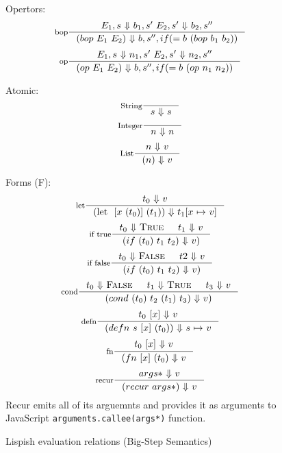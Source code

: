 \begin{figure}[ht]
\centering
Opertors:
\[
\inference[bop]{E_1, s \ $$\Downarrow$$ \ b_1, s' \ E_2, s' \ $$\Downarrow$$ \ b_2, s''}
{(bop \ E_1 \ E_2) \ $$\Downarrow$$ \ b, s'', if (= b \ (bop \ b_1 \ b_2))}
\]
\[
\inference[op]{E_1, s \ $$\Downarrow$$ \ n_1, s' \ E_2, s' \ $$\Downarrow$$ \ n_2, s''}
{(op \ E_1 \ E_2) \ $$\Downarrow$$ \ b, s'', if (= b \ (op \ n_1 \ n_2))}
\]


Atomic:
\[
\inference[String]{}
{s \ $$\Downarrow$$ \ s}
\]
\[
\inference[Integer]{}
{n \ $$\Downarrow$$ \ n}
\]
\[
\inference[List]{n \ $$\Downarrow$$ \ v}
{(n) \ $$\Downarrow$$ \ v}
\]


Forms (F):
\[
\inference[let]{t_0 \ $$\Downarrow$$ \ v}
{(\text{let } \ {[x \ (t_0)]} \ (t_1)) \ $$\Downarrow$$ \ t_1 {[}x \ $$\mapsto$$ \ v{]} }
\]
\[
\inference[if true]{{t_0} \ $$\Downarrow$$ \ \textsc{True} & t_1 \ $$\Downarrow$$ \ v}
{(if \ (t_0) \ t_1 \ t_2) \ $$\Downarrow$$ \ v) }
\]
\[
\inference[if false]{t_0 \ $$\Downarrow$$ \ \textsc{False} & t2 \ $$\Downarrow$$ \ v}
{(if \ (t_0) \ t_1 \ t_2) \ $$\Downarrow$$ \ v) }
\]
\[
\inference[cond]{t_0 \ $$\Downarrow$$ \ \textsc{False} & t_1 \ $$\Downarrow$$ \ \textsc{True} & t_3 \ $$\Downarrow$$ \ v}
{(cond \ (t_0) \ t_2 \ (t_1) \ t_3) \ $$\Downarrow$$ \ v) }
\]
\[
\inference[defn]{ {t_0 \ [x]} \ $$\Downarrow$$ \ v}
{(defn \ s \ {[x]} \ (t_0)) \ $$\Downarrow$$ \ s \ $$\mapsto$$ \ v }
\]
\[
\inference[fn]{ {t_0 \ [x]} \ $$\Downarrow$$ \ v}
{(fn \ {[x]}  \ (t_0) \ $$\Downarrow$$ \ v }
\]
\[
\inference[recur]{ {args*} \ $$\Downarrow$$ \ v}
{(recur \ {args*}) \ $$\Downarrow$$ \ v }
\]
Recur emits all of its arguemnts and provides it as arguments to JavaScript \texttt{arguments.callee(args*)} function.
\caption{Lispish evaluation relations (Big-Step Semantics)}
\label{fig:lispish-big-step}
\end{figure}